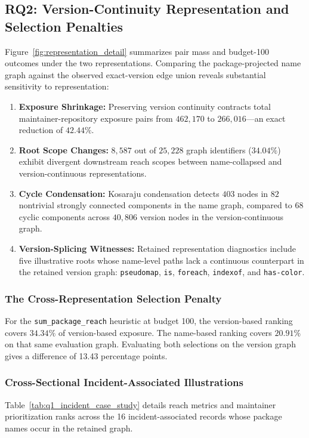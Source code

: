 \subsection{RQ2: Version-Continuity Representation and Selection Penalties}
Figure~\ref{fig:representation_detail} summarizes pair mass and budget-100 outcomes under the two representations.
Comparing the package-projected name graph against the observed exact-version edge union reveals substantial sensitivity to representation:
\begin{enumerate}
    \item \textbf{Exposure Shrinkage:} Preserving version continuity contracts total maintainer-repository exposure pairs from $462{,}170$ to $266{,}016$---an exact reduction of \textbf{$42.44\%$}.
    \item \textbf{Root Scope Changes:} $8{,}587$ out of $25{,}228$ graph identifiers ($34.04\%$) exhibit divergent downstream reach scopes between name-collapsed and version-continuous representations.
    \item \textbf{Cycle Condensation:} Kosaraju condensation detects $403$ nodes in $82$ nontrivial strongly connected components in the name graph, compared to $68$ cyclic components across $40{,}806$ version nodes in the version-continuous graph.
    \item \textbf{Version-Splicing Witnesses:} Retained representation diagnostics include five illustrative roots whose name-level paths lack a continuous counterpart in the retained version graph: \texttt{pseudomap}, \texttt{is}, \texttt{foreach}, \texttt{indexof}, and \texttt{has-color}.
\end{enumerate}

\subsubsection{The Cross-Representation Selection Penalty}
For the \texttt{sum\_package\_reach} heuristic at budget 100, the version-based ranking covers $34.34\%$ of version-based exposure. The name-based ranking covers $20.91\%$ on that same evaluation graph. Evaluating both selections on the version graph gives a difference of 13.43 percentage points.

\subsubsection{Cross-Sectional Incident-Associated Illustrations}
Table~\ref{tab:q1_incident_case_study} details reach metrics and maintainer prioritization ranks across the 16 incident-associated records whose package names occur in the retained graph.

